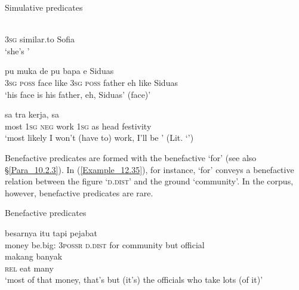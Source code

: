 \begin{styleExampleTitle}
Simulative predicates
\end{styleExampleTitle}

\ea
\label{Example_12.32}
 {} {}\\ %
 \textsc{3sg}  similar.to  Sofia\\
\glt 
‘she’s ’ \textstyleExampleSource{[081115-001a-Cv.0283]}
\z

\ea
\label{Example_12.33}
 {pu} {muka} {} {de} {pu} {bapa} {e} {} {Siduas}\\ %
 \textsc{3sg}  \textsc{poss}  face  like  \textsc{3sg}  \textsc{poss}  father  eh  like  Siduas\\
\glt 
‘his face is  his father, eh,  Siduas’ (face)’ \textstyleExampleSource{[080922-001a-CvPh.1446]}
\z

\ea
\label{Example_12.34}
 {sa} {tra} {kerja,} {sa} {} {} {}\\ %
 most  \textsc{1sg}  \textsc{neg}  work  \textsc{1sg}  as  head  festivity\\
 ‘most likely I won’t (have to) work, I’ll be ’ (Lit. ‘’) \textstyleExampleSource{[080919-004-NP.0068]}
\z


Benefactive predicates are formed with the benefactive   ‘for’ (see also §\ref{Para_10.2.3}). In (\ref{Example_12.35}), for instance,  ‘for’ conveys a benefactive relation between the figure  ‘\textsc{d.dist}’ and the ground  ‘community’. In the corpus, however, benefactive predicates are rare.


\begin{styleExampleTitle}
Benefactive predicates
\end{styleExampleTitle}

\ea
\label{Example_12.35}
 {{besarnya}} {itu} {} {} {tapi} {pejabat}\\ %
 money  {be.big:\textsc{ 3possr}}  \textsc{d.dist}  for  community  but  official\\
  makang  {banyak}\\
 {\textsc{rel}}  eat  {many}\\
\glt
‘most of that money, that’s  but (it’s) the officials who take lots (of it)’ \textstyleExampleSource{[081029-004-Cv.0002]}
\z

